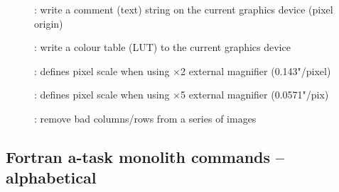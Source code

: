 \begin{description}
\begin{description}
\item []: write a comment (text) string on the
current graphics device (pixel origin)

\item []: write a colour table (LUT) to the
current graphics device

\item []: defines pixel scale when using
$\times$2 external magnifier (0.143"/pixel)

\item []: defines pixel scale when using
$\times$5 external magnifier (0.0571"/pix)

\item []: remove bad columns/rows from a series
of images

\end{description}
\end{description}


\newpage
\subsection{\label{ss:atask_applications}Fortran a-task monolith commands -- alphabetical}

